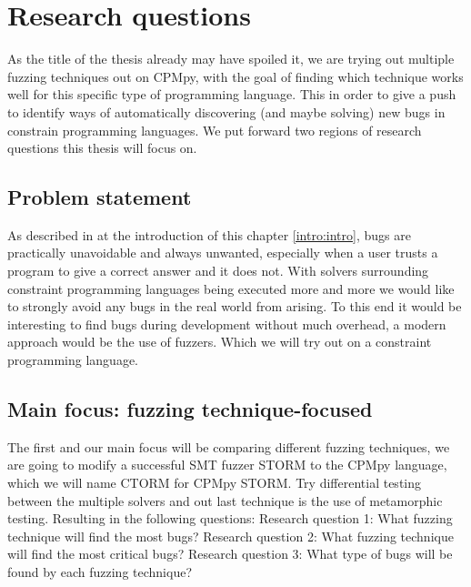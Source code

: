 \section{Research questions}
\label{intro:RQ:RQ's}
As the title of the thesis already may have spoiled it, we are trying out multiple fuzzing techniques out on CPMpy, with the goal of finding which technique works well for this specific type of programming language. This in order to give a push to identify ways of automatically discovering (and maybe solving) new bugs in constrain programming languages. We put forward two regions of research questions this thesis will focus on.

\subsection{Problem statement}
\label{intro:ProblemStatment}
As described in at the introduction of  this chapter \ref{intro:intro}, bugs are practically unavoidable and always unwanted, especially when a user trusts a program to give a correct answer and it does not. With solvers surrounding constraint programming languages being executed more and more we would like to strongly avoid any bugs in the real world from arising. To this end it would be interesting to find bugs during development without much overhead, a modern approach would be the use of fuzzers. Which we will try out on a constraint programming language.

\subsection{Main focus: fuzzing technique-focused}
\label{intro:RQ:MainFocus}
The first and our main focus will be comparing different fuzzing techniques, we are going to modify a successful SMT fuzzer STORM to the CPMpy language, which we will name CTORM for CPMpy STORM. Try differential testing between the multiple solvers and out last technique is the use of metamorphic testing. Resulting in the following questions: \newline
Research question 1: What fuzzing technique will find the most bugs? \newline 
Research question 2: What fuzzing technique will find the most critical bugs? \newline
Research question 3: What type of bugs will be found by each fuzzing technique? \newline

